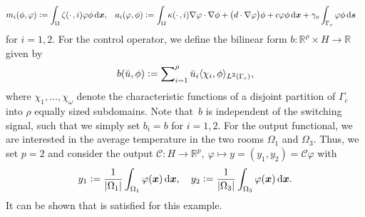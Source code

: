 \documentclass[reqno]{amsart}
\newcommand{\MK}[1]{{\color{magenta}#1\textsuperscript{MK}}}
\newcommand{\bx}{{\bm x}}
\newcommand{\bs}{{\bm s}}
\newcommand{\R}{\mathbb R}
\newcommand{\inpVar}{u}
\newcommand{\inpVarDim}{\rho}
\newcommand{\outVarDim}{p}
\newcommand{\cOper}{\calC}
\newcommand{\advection}{d}
\newcommand{\calC}{\mathcal{C}}
\begin{document}
\begin{align*}
    m_i(\phi,\varphi)&\vcentcolon= \int_\Omega\zeta(\cdot\,,i)\varphi\phi\,\mathrm d\bx, & 
    a_i(\varphi,\phi)&\vcentcolon=\int_\Omega\kappa(\cdot\,,i)\nabla \varphi\cdot\nabla\phi + \big(\advection\cdot\nabla\varphi\big)\phi+c \varphi \phi\,\mathrm d\bx + \gamma_o\int_{\Gamma_o}\varphi\phi\,\mathrm d\bs
\end{align*}
for $i=1,2$. For the control operator, we define the bilinear form $b\colon \R^{\inpVarDim}\times H \to \R$ given by 
\begin{align*}
	 b(\bar{\inpVar},\phi) \vcentcolon= \sum\nolimits_{i=1}^{\inpVarDim} \bar{\inpVar}_i \langle \chi_i,\phi\rangle_{L^2(\Gamma_{\mathrm{c}})},
\end{align*}
where $\chi_1,\ldots, \chi_\omega$ denote the characteristic functions of a disjoint partition of $\Gamma_c$ into $\inpVarDim$ equally sized subdomains.
Note that~$b$ is independent of the switching signal, such that we simply set $b_i = b$ for $i=1,2$.
%
For the output functional, we are interested in the average temperature in the two rooms $\Omega_1$ and $\Omega_3$. Thus, we set $\outVarDim=2$ and consider the output $\cOper:H\to\R^{\outVarDim},\ \varphi \mapsto y=(y_1,y_2)=\cOper\varphi$ with
%
\begin{align*}
    y_1 \vcentcolon= \frac{1}{|\Omega_1|}\int_{\Omega_1}\varphi(\bx)\,\mathrm d\bx,\quad y_2 \vcentcolon=\frac{1}{|\Omega_3|}\int_{\Omega_3}\varphi(\bx)\,\mathrm d\bx.
\end{align*}
%
It can be shown that  is satisfied for this example.
\end{document}
